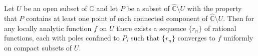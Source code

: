 Let $U$ be an open subset of $\mathbb{C}$ and let $P$ be a subset of $\hat{\mathbb{C}} \setminus U$ with the property that $P$ contains at least one point of each connected component of $\hat{\mathbb{C}} \setminus U$. Then for any locally analytic function $f$ on $U$ there exists a sequence $\{r_n\}$ of rational functions, each with poles confined to $P$, such that $\{r_n\}$ converges to $f$ uniformly on compact subsets of $U$.
